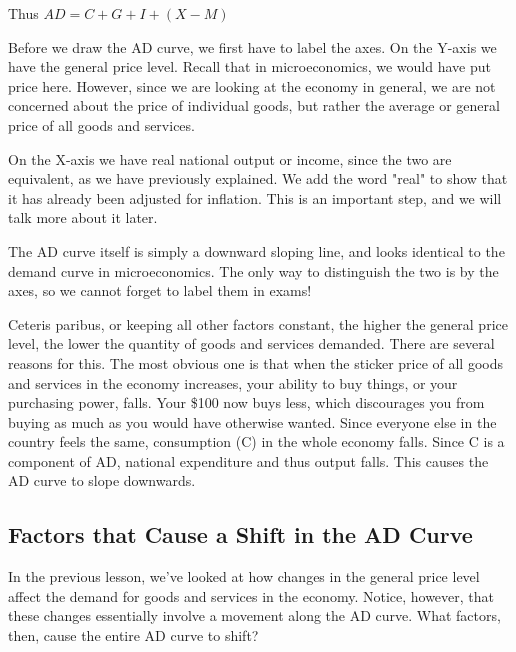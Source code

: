 Thus $AD = C + G + I + (X-M)$

Before we draw the AD curve, we first have to label the axes. On the Y-axis we have the general price level. Recall that in microeconomics, we would have put price here. However, since we are looking at the economy in general, we are not concerned about the price of individual goods, but rather the average or general price of all goods and services. 

On the X-axis we have real national output or income, since the two are equivalent, as we have previously explained. We add the word "real" to show that it has already been adjusted for inflation. This is an important step, and we will talk more about it later. 

The AD curve itself is simply a downward sloping line, and looks identical to the demand curve in microeconomics. The only way to distinguish the two is by the axes, so we cannot forget to label them in exams!

Ceteris paribus, or keeping all other factors constant, the higher the general price level, the lower the quantity of goods and services demanded. There are several reasons for this. The most obvious one is that when the sticker price of all goods and services in the economy increases, your ability to buy things, or your purchasing power, falls. Your \$100 now buys less, which discourages you from buying as much as you would have otherwise wanted. Since everyone else in the country feels the same, consumption (C) in the whole economy falls. Since C is a component of AD, national expenditure and thus output falls. This causes the AD curve to slope downwards.
\subsection{Factors that Cause a Shift in the AD Curve}
In the previous lesson, we’ve looked at how changes in the general price level affect the demand for goods and services in the economy. Notice, however, that these changes essentially involve a movement along the AD curve. What factors, then, cause the entire AD curve to shift?

